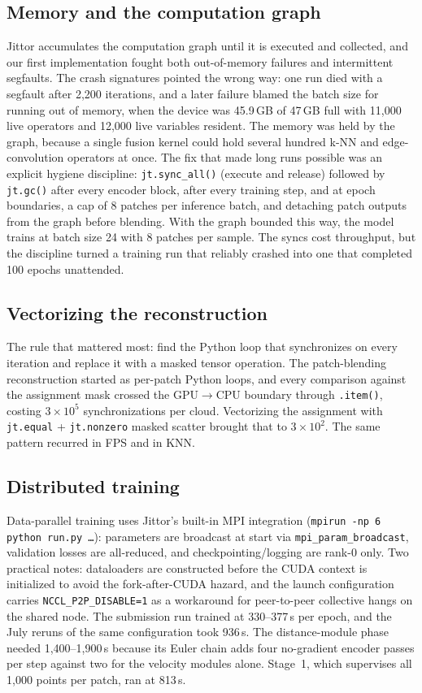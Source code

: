 \documentclass{article}
\begin{document}
\subsection{Memory and the computation graph}

Jittor accumulates the computation graph until it is executed and collected, and our first implementation fought both out-of-memory failures and intermittent segfaults. The crash signatures pointed the wrong way: one run died with a segfault after 2{,}200 iterations, and a later failure blamed the batch size for running out of memory, when the device was 45.9\,GB of 47\,GB full with 11{,}000 live operators and 12{,}000 live variables resident. The memory was held by the graph, because a single fusion kernel could hold several hundred k-NN and edge-convolution operators at once. The fix that made long runs possible was an explicit hygiene discipline: \texttt{jt.sync\_all()} (execute and release) followed by \texttt{jt.gc()} after every encoder block, after every training step, and at epoch boundaries, a cap of 8 patches per inference batch, and detaching patch outputs from the graph before blending. With the graph bounded this way, the model trains at batch size 24 with 8 patches per sample. The syncs cost throughput, but the discipline turned a training run that reliably crashed into one that completed 100 epochs unattended.

\subsection{Vectorizing the reconstruction}

The rule that mattered most: find the Python loop that synchronizes on every iteration and replace it with a masked tensor operation. The patch-blending reconstruction started as per-patch Python loops, and every comparison against the assignment mask crossed the GPU$\to$CPU boundary through \texttt{.item()}, costing $3\times10^5$ synchronizations per cloud. Vectorizing the assignment with \texttt{jt.equal} + \texttt{jt.nonzero} masked scatter brought that to $3\times10^2$. The same pattern recurred in FPS and in KNN.

\subsection{Distributed training}

Data-parallel training uses Jittor's built-in MPI integration (\texttt{mpirun -np 6 python run.py \dots}): parameters are broadcast at start via \texttt{mpi\_param\_broadcast}, validation losses are all-reduced, and checkpointing/logging are rank-0 only. Two practical notes: dataloaders are constructed before the CUDA context is initialized to avoid the fork-after-CUDA hazard, and the launch configuration carries \texttt{NCCL\_P2P\_DISABLE=1} as a workaround for peer-to-peer collective hangs on the shared node. The submission run trained at 330--377\,s per epoch, and the July reruns of the same configuration took 936\,s. The distance-module phase needed 1{,}400--1{,}900\,s because its Euler chain adds four no-gradient encoder passes per step against two for the velocity modules alone. Stage~1, which supervises all 1{,}000 points per patch, ran at 813\,s.
\end{document}
